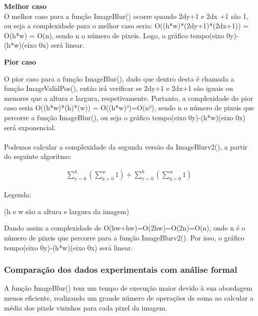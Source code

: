 \documentclass{article}
\begin{document}
\textbf{Melhor caso}\\
O melhor caso para a função ImageBlur() ocorre quando 2dy+1 e 2dx +1 são 1, ou seja a complexidade para 
o melhor caso seria: O((h*w)*(2dy+1)*(2dx+1)) = O(h*w) = O(n), sendo n o número de pixeis. Logo, 
o gráfico tempo(eixo 0y)-(h*w)(eixo 0x) será linear.

 \textbf{Pior caso}

O pior caso para a função ImageBlur(), dado que dentro desta é chamada a função ImageValidPos(), então irá 
verificar se 2dy+1 e 2dx+1 são iguais ou menores que a altura e largura, respetivamente. Portanto, 
a complexidade do pior caso seria O((h*w)*(h)*(w)) = O((h*w)²)=O(n²), sendo n o número de pixeis que percorre a função ImageBlur(), ou seja 
o gráfico tempo(eixo 0y)-(h*w)(eixo 0x) será exponencial.\\









\\

Podemos calcular a complexidade da segunda versão da ImageBlurv2(), a partir do seguinte algoritmo:

\begin{align*}
    \sum_{\text{y}=0}^{h} (\sum_{\text{x}=0}^{w}1) + \sum_{\text{y}=0}^{h} (\sum_{\text{x}=0}^{w}1) 
    \end{align*}
    
    \begin{center}
    Legenda:
    
    (h e w são a altura e largura da imagem)
    \end{center}
    
    Dando assim a complexidade de O(hw+hw)=O(2hw)=O(2n)=O(n), onde n é o número de pixeis que percorre para a função ImageBlurv2().
    Por isso, o gráfico tempo(eixo 0y)-(h*w)(eixo 0x) será linear.


\subsubsection{Comparação dos dados experimentais com análise formal}

A função ImageBlur() tem um tempo de execução maior devido à sua abordagem menos eficiente, realizando um grande número de operações de soma ao calcular a média dos pixels vizinhos para cada pixel da imagem.
\end{document}
